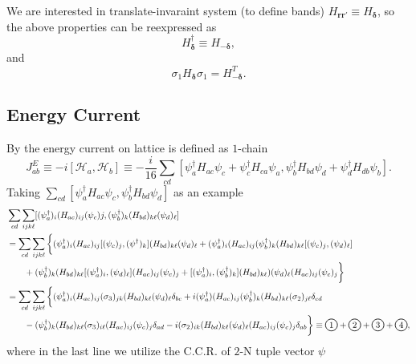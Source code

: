\documentclass[10pt,nofootinbib]{revtex4}
\newcommand*\circled[1]{\tikz[baseline=(char.base)]{
            \node[shape=circle,draw,inner sep=2pt,thick] (char) {#1};}}
\begin{document}
		\indent We are interested in translate-invaraint system (to define bands) $H_{\bm{rr'}}\equiv H_{\bm{\delta}}$, so the above properties can be reexpressed as
		\begin{equation}\label{1.1.6}
			H_{\bm{\delta}}^\dagger\equiv H_{-\bm{\delta}},
		\end{equation}
		and
		\begin{equation}\label{1.1.7}
			\sigma_1 H_{\bm{\delta}}\sigma_1=H_{\bm{-\delta}}^T.
		\end{equation}

	\subsection{Energy Current}
		By \cite{kitaev2006anyons,kapustin2019thermal} the energy current on lattice is defined as $1$-chain
		\begin{equation}\label{1.2.1}
			J_{ab}^E\equiv-i[\mathcal{H}_{a},\mathcal{H}_{b}]\equiv-\dfrac{i}{16}\sum_{cd}[\psi^\dagger_aH_{ac}\psi_c+\psi_c^\dagger H_{ca}\psi_a,\psi^\dagger_b H_{bd}\psi_d+\psi_d^\dagger H_{db}\psi_b].
		\end{equation}
		Taking $\displaystyle\sum_{cd}[\psi_a^\dagger H_{ac}\psi_c,\psi_b^\dagger H_{bd}\psi_d]$ as an example
		\begin{align*}
			&\sum_{cd}\sum_{ijk\ell}[(\psi_a^\dagger)_i (H_{ac})_{ij}(\psi_c)j,(\psi_b^\dagger)_k (H_{bd})_{k\ell}(\psi_d)_\ell]\\
			&=\sum_{cd}\sum_{ijk\ell}\bigg\{(\psi_a^\dagger)_i(H_{ac})_{ij}[(\psi_c)_j,(\psi^\dagger)_k](H_{bd})_{k\ell}(\psi_d)_\ell+(\psi_a^\dagger)_i (H_{ac})_{ij}(\psi_b^\dagger)_k(H_{bd})_{k\ell}[(\psi_c)_j,(\psi_d)_\ell]\\
			&\qquad+(\psi_b^\dagger)_k (H_{bd})_{k\ell}[(\psi_a^\dagger)_i,(\psi_d)_\ell](H_{ac})_{ij}(\psi_c)_j+[(\psi_a^\dagger)_i,(\psi_b^\dagger)_k](H_{bd})_{k\ell})(\psi_d)_\ell(H_{ac})_{ij}(\psi_c)_j\bigg\}\\
			&=\sum_{cd}\sum_{ijk\ell}\bigg\{(\psi_a^\dagger)_i(H_{ac})_{ij}(\sigma_3)_{jk}(H_{bd})_{k\ell}(\psi_d)_\ell\delta_{bc}+i(\psi_a^\dagger)(H_{ac})_{ij}(\psi_b^\dagger)_k(H_{bd})_{k\ell}(\sigma_2)_{j\ell}\delta_{cd}\\
			&\qquad-(\psi_b^\dagger)_k(H_{bd})_{k\ell}(\sigma_3)_{i\ell}(H_{ac})_{ij}(\psi_c)_j\delta_{ad}-i(\sigma_2)_{ik}(H_{bd})_{k\ell}(\psi_d)_\ell(H_{ac})_{ij}(\psi_c)_j\delta_{ab}\bigg\}\equiv \circled{1}+\circled{2}+\circled{3}+\circled{4},
		\end{align*}
		where in the last line we utilize the C.C.R. of $2$-N tuple vector $\psi$
\end{document}
